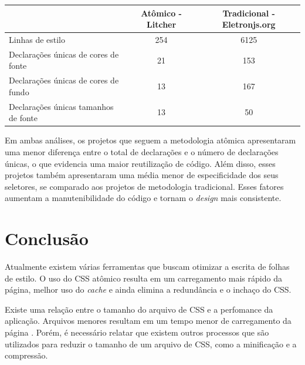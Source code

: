 \begin{table}[H]
\begin{tabular}{|l|c|c|}
\hline
                                     & \textbf{Atômico - Litcher} & \textbf{Tradicional - Eletronjs.org} \\ \hline
Linhas de estilo                     & 254                        & 6125                                 \\ \hline
Declarações únicas de cores de fonte & 21                         & 153                                  \\ \hline
Declarações únicas de cores de fundo & 13                         & 167                                  \\ \hline
Declarações únicas tamanhos de fonte & 13                         & 50                                   \\ \hline
\end{tabular}
\end{table}

Em ambas análises, os projetos que seguem a metodologia atômica apresentaram uma menor diferença entre o total de declarações e o número de declarações únicas, o que evidencia uma maior reutilização de código. Além disso, esses projetos também apresentaram uma média menor de especificidade dos seus seletores, se comparado aos projetos de metodologia tradicional. Esses fatores aumentam a manutenibilidade do código e tornam o \emph{design} mais consistente.



\newpage



\hypertarget{conclusuxe3o}{%
\chapter{Conclusão}\label{conclusuxe3o}}

Atualmente existem várias ferramentas que buscam otimizar a escrita de
folhas de estilo. O uso do CSS atômico resulta em um carregamento mais
rápido da página, melhor uso do \emph{cache} e ainda elimina a
redundância e o inchaço do CSS.

Existe uma relação entre o tamanho do arquivo de CSS e a perfomance da aplicação. Arquivos menores resultam em um tempo menor de carregamento da página \cite{ardeljan, bece}. Porém, é necessário relatar que existem outros processos que são utilizados para reduzir o tamanho de um arquivo de CSS, como a minificação e a compressão.

